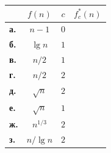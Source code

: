 \begin{center}
\renewcommand{\arraystretch}{1.2}
\begin{tabular}{lcc|c}
\toprule
& $f(n)$ & $c$ & $f^*_c(n)$ \\ \midrule
\textbf{а.} & $n-1$ & $0$ & \\ \hline
\textbf{б.} & $\lg n$ & $1$ & \\ \hline
\textbf{в.} & $n/2$ & $1$ & \\ \hline
\textbf{г.} & $n/2$ & $2$ & \\ \hline
\textbf{д.} & $\sqrt{n}$ & $2$ & \\ \hline
\textbf{е.} & $\sqrt{n}$ & $1$ & \\ \hline
\textbf{ж.} & $n^{1/3}$ & $2$ & \\ \hline
\textbf{з.} & $n/\lg n$ & $2$ & \\ 
\bottomrule
\end{tabular}
\end{center}